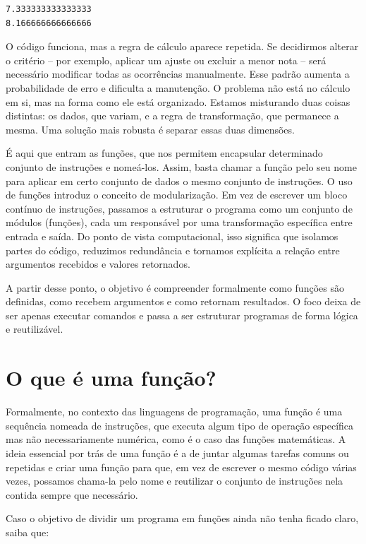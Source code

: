 \documentclass[
  brazilian,
  letterpaper,
  DIV=11,
  numbers=noendperiod]{scrreprt}
\begin{document}
\begin{verbatim}
7.333333333333333
8.166666666666666
\end{verbatim}

O código funciona, mas a regra de cálculo aparece repetida. Se
decidirmos alterar o critério -- por exemplo, aplicar um ajuste ou
excluir a menor nota -- será necessário modificar todas as ocorrências
manualmente. Esse padrão aumenta a probabilidade de erro e dificulta a
manutenção. O problema não está no cálculo em si, mas na forma como ele
está organizado. Estamos misturando duas coisas distintas: os dados, que
variam, e a regra de transformação, que permanece a mesma. Uma solução
mais robusta é separar essas duas dimensões.

É aqui que entram as funções, que nos permitem encapsular determinado
conjunto de instruções e nomeá-los. Assim, basta chamar a função pelo
seu nome para aplicar em certo conjunto de dados o mesmo conjunto de
instruções. O uso de funções introduz o conceito de modularização. Em
vez de escrever um bloco contínuo de instruções, passamos a estruturar o
programa como um conjunto de módulos (funções), cada um responsável por
uma transformação específica entre entrada e saída. Do ponto de vista
computacional, isso significa que isolamos partes do código, reduzimos
redundância e tornamos explícita a relação entre argumentos recebidos e
valores retornados.

A partir desse ponto, o objetivo é compreender formalmente como funções
são definidas, como recebem argumentos e como retornam resultados. O
foco deixa de ser apenas executar comandos e passa a ser estruturar
programas de forma lógica e reutilizável.

\section{O que é uma função?}\label{o-que-uxe9-uma-funuxe7uxe3o}

Formalmente, no contexto das linguagens de programação, uma função é uma
sequência nomeada de instruções, que executa algum tipo de operação
específica mas não necessariamente numérica, como é o caso das funções
matemáticas. A ideia essencial por trás de uma função é a de juntar
algumas tarefas comuns ou repetidas e criar uma função para que, em vez
de escrever o mesmo código várias vezes, possamos chama-la pelo nome e
reutilizar o conjunto de instruções nela contida sempre que necessário.

Caso o objetivo de dividir um programa em funções ainda não tenha ficado
claro, saiba que:
\end{document}
